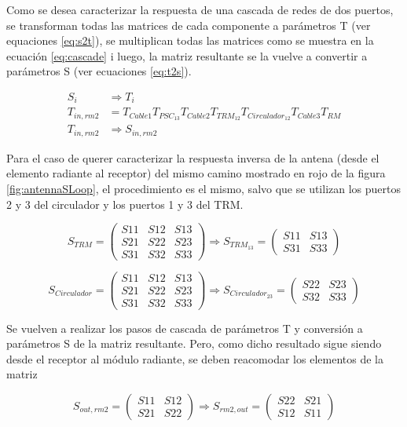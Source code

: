 Como se desea caracterizar la respuesta de una cascada de redes de dos puertos, se transforman todas las matrices de cada
componente a parámetros T (ver equaciones \ref{eq:s2t}), se multiplican todas las matrices como se muestra en la ecuación
\ref{eq:cascade} i luego, la matriz resultante se la vuelve a convertir a parámetros S (ver ecuaciones \ref{eq:t2s}).

$$
\begin{aligned}
	S_i &\Rightarrow T_i \\
	T_{in,rm2} &= T_{Cable1}T_{PSC_{13}}T_{Cable2}T_{TRM_{12}}T_{Circulador_{12}}T_{Cable3}T_{RM}\\
	T_{in,rm2} &\Rightarrow S_{in,rm2}
\end{aligned}
$$

Para el caso de querer caracterizar la respuesta inversa de la antena (desde el elemento radiante al receptor) del mismo camino
mostrado en rojo de la figura \ref{fig:antennaSLoop}, el procedimiento es el mismo, salvo que se utilizan los puertos 2 y 3 del
circulador y los puertos 1 y 3 del TRM.

$$
	S_{TRM} = \begin{pmatrix} S11&S12&S13 \\ S21&S22&S23 \\ S31&S32&S33\end{pmatrix} \Rightarrow
	S_{TRM_{13}} = \begin{pmatrix} S11&S13 \\ S31&S33 \end{pmatrix}
$$

$$
	S_{Circulador} = \begin{pmatrix} S11&S12&S13 \\ S21&S22&S23 \\ S31&S32&S33\end{pmatrix} \Rightarrow
	S_{Circulador_{23}} = \begin{pmatrix} S22&S23 \\ S32&S33 \end{pmatrix}
$$

Se vuelven a realizar los pasos de cascada de parámetros T y conversión a parámetros S de la matriz resultante. Pero, como
dicho resultado sigue siendo desde el receptor al módulo radiante, se deben reacomodar los elementos de la matriz

$$
	S_{out,rm2} = \begin{pmatrix} S11&S12 \\ S21&S22\end{pmatrix} \Rightarrow
	S_{rm2, out} = \begin{pmatrix} S22&S21 \\ S12&S11 \end{pmatrix}
$$
